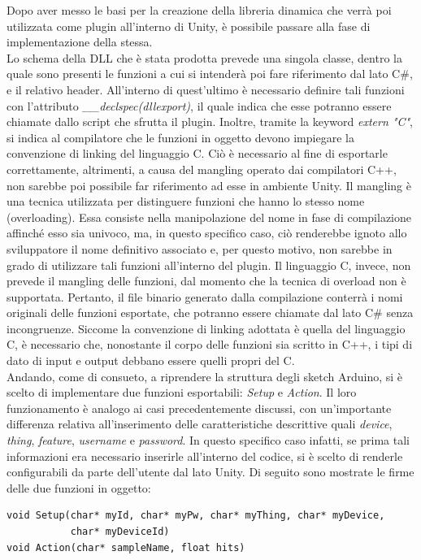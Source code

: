 Dopo aver messo le basi per la creazione della libreria dinamica che verrà poi utilizzata come plugin all'interno di Unity, è possibile passare alla fase di implementazione della stessa.\\
Lo schema della DLL che è stata prodotta prevede una singola classe, dentro la quale sono presenti le funzioni a cui si intenderà poi fare riferimento dal lato C\#, e il relativo header. All'interno di quest'ultimo è necessario definire tali funzioni con l’attributo \textit{\_\_declspec(dllexport)}, il quale indica che esse potranno essere chiamate dallo script che sfrutta il plugin. Inoltre, tramite la keyword \textit{extern "C"}, si indica al compilatore che le funzioni in oggetto devono impiegare la convenzione di linking del linguaggio C. Ciò è necessario al fine di esportarle correttamente, altrimenti, a causa del mangling operato dai compilatori C++, non sarebbe poi possibile far riferimento ad esse in ambiente Unity. Il mangling è una tecnica utilizzata per distinguere funzioni che hanno lo stesso nome (overloading). Essa consiste nella manipolazione del nome in fase di compilazione affinché esso sia univoco, ma, in questo specifico caso, ciò renderebbe ignoto allo sviluppatore il nome definitivo associato e, per questo motivo, non sarebbe in grado di utilizzare tali funzioni all'interno del plugin. Il linguaggio C, invece, non prevede il mangling delle funzioni, dal momento che la tecnica di overload non è supportata. Pertanto, il file binario generato dalla compilazione conterrà i nomi originali delle funzioni esportate, che potranno essere chiamate dal lato C\# senza incongruenze. Siccome la convenzione di linking adottata è quella del linguaggio C, è necessario che, nonostante il corpo delle funzioni sia scritto in C++, i tipi di dato di input e output debbano essere quelli propri del C.\\
Andando, come di consueto, a riprendere la struttura degli sketch Arduino, si è scelto di implementare due funzioni esportabili: \textit{Setup} e \textit{Action}. Il loro funzionamento è analogo ai casi precedentemente discussi, con un’importante differenza relativa all’inserimento delle caratteristiche descrittive quali \textit{device}, \textit{thing}, \textit{feature}, \textit{username} e \textit{password}. In questo specifico caso infatti, se prima tali informazioni era necessario inserirle all'interno del codice, si è scelto di renderle configurabili da parte dell'utente dal lato Unity. Di seguito sono mostrate le firme delle due funzioni in oggetto:
\begin{verbatim}
void Setup(char* myId, char* myPw, char* myThing, char* myDevice,
           char* myDeviceId)
void Action(char* sampleName, float hits)
\end{verbatim}
